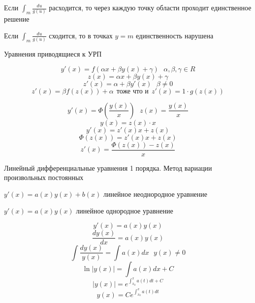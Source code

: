 \begin{theorem}
  Если $\int_m \frac{du}{g(u)}$ расходится, то через каждую точку области
  проходит единственное решение

  Если $\int_m \frac{du}{g(u)}$ сходится, то в точках $y = m$ единственность
  нарушена
\end{theorem}

\begin{title}[\Large]
  Уравнения приводящиеся к УРП
\end{title}

\begin{block}
  $$
  y'(x) = f(\alpha x + \beta y(x) + \gamma) ~~~ \alpha, \beta, \gamma \in R
  $$
  $$
  z(x) = \alpha x + \beta y(x) + \gamma
  $$
  $$
  z'(x) = \alpha + \beta y'(x) ~~~ \beta \not= 0
  $$
  $$
  z'(x) = \beta f(z(x)) + \alpha ~~ \text{тоже что и} ~~
  z'(x) = 1 \cdot g(z(x))
  $$
\end{block}

\begin{block}
  $$
  y'(x) = \Phi \left( \frac{y(x)}{x} \right) ~~~ z(x) = \frac{y(x)}{x}
  $$
  $$
  y(x) = z(x) \cdot x
  $$
  $$
  y'(x) = z'(x) x + z(x)
  $$
  $$
  \Phi(z(x)) = z'(x)x + z(x)
  $$
  $$
  z'(x) = \frac{\Phi(z(x)) - z(x)}{x}
  $$
\end{block}

\begin{title}[\Large]
  Линейный дифференциальные уравнения 1 порядка. Метод вариации произвольных
  постоянных
\end{title}

\begin{define}
  $y'(x) = a(x)y(x) + b(x)$ линейное неоднородное уравнение

  $y'(x) = a(x)y(x)$ линейное однородное уравнение
\end{define}

\begin{block}
  $$
  y'(x) = a(x)y(x)
  $$
  $$
  \frac{dy(x)}{dx} = a(x)y(x)
  $$
  $$
  \int \frac{dy(x)}{y(x)} = \int a(x)dx ~~~ y(x) \not= 0
  $$
  $$
  \ln |y(x)| = \int a(x)dx + C
  $$
  $$
  |y(x)| = e^{\int_{x_0}^x a(t) dt + C}
  $$
  $$
  y(x) = C e^{\int_{x_0}^x a(t) dt}
  $$
\end{block}

